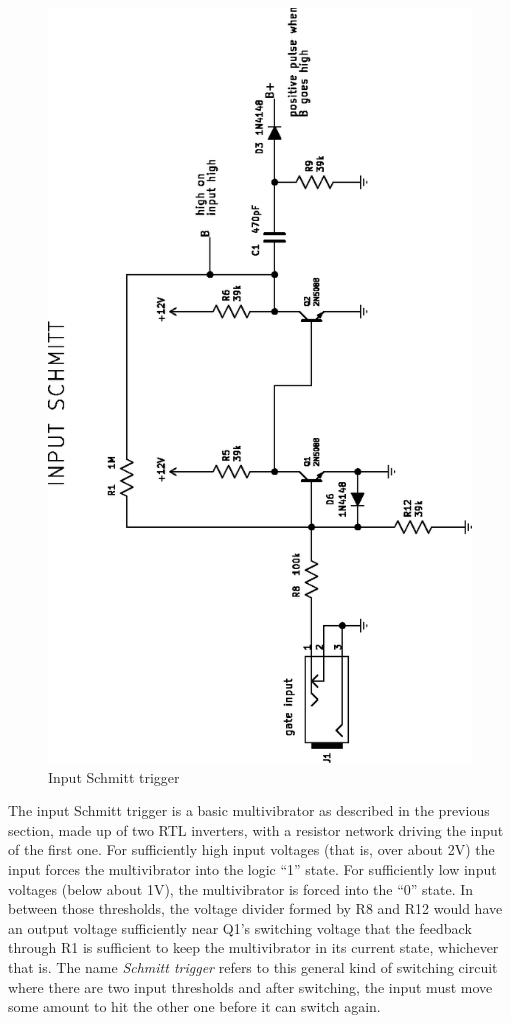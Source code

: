 \begin{figure}
  \centering\includegraphics[angle=-90]{input-schmitt}\par
  \caption{Input Schmitt trigger}
  \label{fig:input-schmitt}
\end{figure}

The input Schmitt trigger is a basic multivibrator as described in the
previous section, made up of two RTL inverters, with a resistor network
driving the input of the first one.  For sufficiently high input voltages
(that is, over about 2V) the input forces the multivibrator into the logic
``1'' state.  For sufficiently low input voltages (below about 1V), the
multivibrator is forced into the ``0'' state.  In between those thresholds,
the voltage divider formed by R8 and R12 would have an output voltage
sufficiently near Q1's switching voltage that the feedback through R1 is
sufficient to keep the multivibrator in its current state, whichever that
is.  The name \emph{Schmitt trigger} refers to this general kind of
switching circuit where there are two input thresholds and after switching,
the input must move some amount to hit the other one before it can switch
again.

